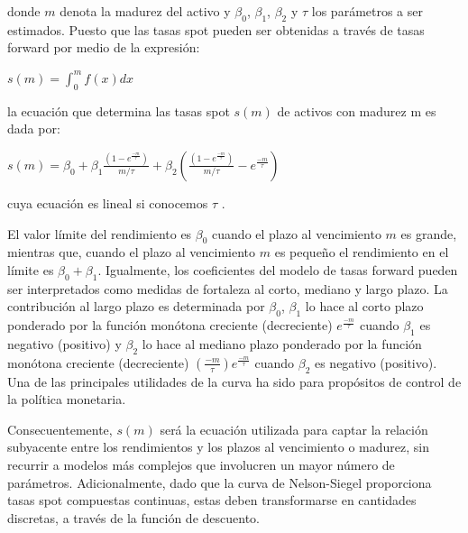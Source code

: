 \vspace*{0.2 cm}

\noindent donde $m$ denota la madurez del activo y $\beta_{0}$, $\beta_{1}$, $\beta_{2}$ y $\tau$ los par\'ametros a ser
estimados. Puesto que las tasas spot pueden ser obtenidas a trav\'es de tasas
forward por medio de la expresi\'on:

\vspace*{0.2 cm}

\begin{center}
$\displaystyle{s(m) = \int_{0}^{m}f(x)dx}$
\end{center}

\vspace*{0.2 cm}


\noindent la ecuaci\'on que determina las tasas spot $s(m)$ de activos con madurez m es dada por:

\vspace*{0.2 cm}


\begin{center}
$\displaystyle{s(m) = \beta_{0}+ \beta_{1}\frac{\left(1-e^\frac{-m}{\tau}\right)}{m/\tau} + \beta_{2} \left(\frac{\left(1-e^\frac{-m}{\tau}\right)}{m/\tau} -  e^\frac{-m}{\tau}\right)}$
\end{center}

\vspace*{0.2 cm}

\noindent cuya ecuaci\'on es lineal si conocemos $\tau$ .

\hspace*{0.4 cm} El valor l\'imite del rendimiento es $\beta_{0}$ cuando el plazo al vencimiento $m$ es grande, mientras que, cuando el plazo al vencimiento $m$ es peque\~no el
rendimiento en el l\'imite es $\beta_{0}+\beta_{1}$. Igualmente, los coeficientes del
modelo de tasas forward pueden ser interpretados como medidas de
fortaleza al corto, mediano y largo plazo. La contribuci\'on al largo plazo
es determinada por $\beta_{0}$, $\beta_{1}$ lo hace al corto plazo ponderado por la
funci\'on mon\'otona creciente (decreciente) $e^{\frac{-m}{\tau}}$ cuando $\beta_{1}$ es negativo
(positivo) y $\beta_{2}$ lo hace al mediano plazo ponderado por la funci\'on
mon\'otona creciente (decreciente) $(\frac{-m}{\tau}) e^{\frac{-m}{\tau}}$ cuando $\beta_{2}$ es negativo
(positivo). Una de las principales utilidades de la curva ha sido para
prop\'ositos de control de la pol\'itica monetaria.

\hspace*{0.4 cm} Consecuentemente, $s(m)$ ser\'a la ecuaci\'on utilizada para captar la relaci\'on
subyacente entre los rendimientos y los plazos al vencimiento o madurez,
sin recurrir a modelos m\'as complejos que involucren un mayor n\'umero
de par\'ametros. Adicionalmente, dado que la curva de Nelson-Siegel
proporciona tasas spot compuestas continuas, estas deben transformarse
en cantidades discretas, a trav\'es de la funci\'on de descuento.


